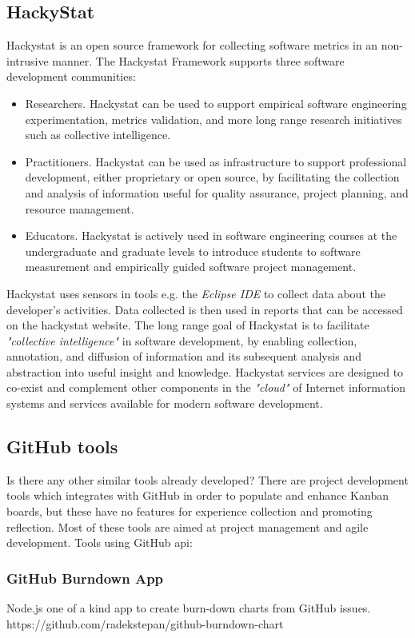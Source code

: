 \subsection{HackyStat}
Hackystat is an open source framework for collecting software metrics in an non-intrusive manner. 
The Hackystat Framework supports three software development communities:
\begin{itemize}
	\item Researchers. Hackystat can be used to support empirical software engineering experimentation, metrics validation, and more long range research initiatives such as collective intelligence.
	\item Practitioners. Hackystat can be used as infrastructure to support professional development, either proprietary or open source, by facilitating the collection and analysis of information useful for quality assurance, project planning, and resource management.
	\item Educators. Hackystat is actively used in software engineering courses at the undergraduate and graduate levels to introduce students to software measurement and empirically guided software project management.
\end{itemize}
Hackystat uses sensors in tools e.g. the \emph{Eclipse IDE} to collect data about the developer's activities. Data collected is then used in reports that can be accessed on the hackystat website. 
The long range goal of Hackystat is to facilitate \emph{"collective intelligence"} in software development, by enabling collection, annotation, and diffusion of information and its subsequent analysis and abstraction into useful insight and knowledge. Hackystat services are designed to co-exist and complement other components in the \emph{"cloud"} of Internet information systems and services available for modern software development.\\ 

\subsection{GitHub tools}
\label{subsec:gittools}
Is there any other similar tools already developed? There are project development tools which integrates with GitHub in order to populate and enhance Kanban boards, but these have no features for experience collection and promoting reflection. Most of these tools are aimed at project management and agile development. 
Tools using GitHub api: \\
\subsubsection*{GitHub Burndown App}
Node.js one of a kind app to create burn-down charts from GitHub issues. 
https://github.com/radekstepan/github-burndown-chart
